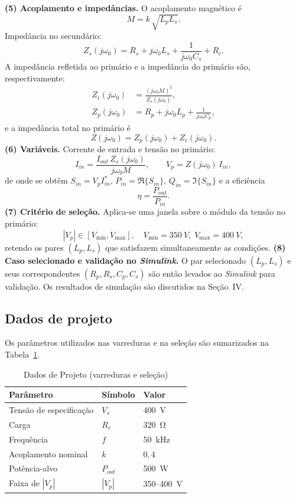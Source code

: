 \documentclass[conference]{IEEEtran}
\begin{document}
\textbf{(5) Acoplamento e impedâncias.}
O acoplamento magnético é
\begin{equation}\label{eq:M_again}
M = k\,\sqrt{L_p L_s}.
\end{equation} Impedância no secundário:
\begin{equation}
\label{eq:Zs_total}
Z_s(j\omega_0)=R_s+j\omega_0 L_s+\frac{1}{j\omega_0 C_s}+R_c.
\end{equation}
A impedância refletida ao primário e a impedância do primário são, respectivamente:
\begin{align}
\label{eq:Zr}
Z_{\text{r}}(j\omega_0)&=\frac{(j\omega_0 M)^2}{Z_s(j\omega_0)},\\
\label{eq:Zp}
Z_p(j\omega_0)&=R_p+j\omega_0 L_p+\frac{1}{j\omega_0 C_p},
\end{align}
e a impedância total no primário é
\begin{equation}
\label{eq:Ztot}
Z(j\omega_0)=Z_p(j\omega_0)+Z_{\text{r}}(j\omega_0).
\end{equation}
\textbf{(6) Variáveis.}
Corrente de entrada e tensão no primário:
\begin{equation}
\label{eq:IinVp}
I_{in}=\frac{I_{out}\,Z_s(j\omega_0)}{j\omega_0 M},\qquad V_p=Z(j\omega_0)\,I_{in},
\end{equation}
de onde se obtêm $S_{in}=V_p I_{in}^*$, $P_{in}=\Re\{S_{in}\}$, $Q_{in}=\Im\{S_{in}\}$ e a eficiência
\begin{equation}
\label{eq:eta}
\eta=\frac{P_{out}}{P_{in}}.
\end{equation}
\textbf{(7) Critério de seleção.}
Aplica-se uma janela sobre o módulo da tensão no primário:
\[
|V_p|\in[V_{\min},V_{\max}],\quad V_{\min}=\SI{350}{V},\; V_{\max}=\SI{400}{V},
\]
retendo os pares $(L_p,L_s)$ que satisfazem simultaneamente as condições. 
\textbf{(8) Caso selecionado e validação no \emph{Simulink}.}
O par selecionado $(L_p,L_s)$ e seus correspondentes $(R_p,R_s,C_p,C_s)$ são então levados ao \emph{Simulink} para validação.
Os resultados de simulação são discutidos na Seção~IV.
\subsection{Dados de projeto}
Os parâmetros utilizados nas varreduras e na seleção são sumarizados na Tabela~\ref{tab:dados}.
\begin{table}[H]
  \caption{Dados de Projeto (varreduras e seleção)}
  \label{tab:dados}
  \centering
  \begin{tabular}{lll}
    \toprule
    Parâmetro & Símbolo & Valor \\
    \midrule
    Tensão de especificação & $V_s$ & \SI{400}{V} \\
    Carga & $R_c$ & \SI{320}{\ohm} \\
    Frequência & $f$ & \SI{50}{kHz} \\
    Acoplamento nominal & $k$ & $0{,}4$ \\
    Potência-alvo & $P_{out}$ & \SI{500}{\watt} \\
    Faixa de $|V_p|$ & $|V_p|$ & \SI{350}{}–\SI{400}{\volt} \\
    \bottomrule
  \end{tabular}
\end{table}
\end{document}
